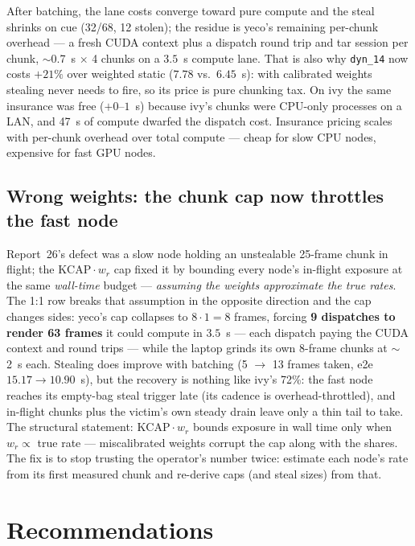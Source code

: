 \documentclass[
	english,
	letterpaper, oneside
]{article}
\begin{document}
After batching, the lane costs converge toward pure compute and the
steal shrinks on cue (32/68, 12 stolen); the residue is yeco's remaining
per-chunk overhead --- a fresh CUDA context plus a dispatch round trip
and tar session per chunk, $\sim$0.7~s $\times$ 4 chunks on a $3.5$~s
compute lane. That is also why \texttt{dyn\_14} now costs $+21\%$ over
weighted static ($7.78$ vs.\ $6.45$~s): with calibrated weights stealing
never needs to fire, so its price is pure chunking tax. On ivy the same
insurance was free ($+0$--$1$~s) because ivy's chunks were CPU-only
processes on a LAN, and 47~s of compute dwarfed the dispatch cost.
Insurance pricing scales with per-chunk overhead over total compute ---
cheap for slow CPU nodes, expensive for fast GPU nodes.

\subsection{Wrong weights: the chunk cap now throttles the fast node}
\label{sec:capdefect}

Report~26's defect was a slow node holding an unstealable 25-frame chunk
in flight; the $\mathrm{KCAP}\cdot w_r$ cap fixed it by bounding
every node's in-flight exposure at the same \emph{wall-time} budget ---
\emph{assuming the weights approximate the true rates}. The 1:1 row
breaks that assumption in the opposite direction and the cap changes
sides: yeco's cap collapses to $8\cdot1=8$ frames, forcing \textbf{9
dispatches to render 63 frames} it could compute in $3.5$~s --- each
dispatch paying the CUDA context and round trips --- while the laptop
grinds its own 8-frame chunks at $\sim$2~s each. Stealing does improve
with batching (5 $\to$ 13 frames taken, e2e $15.17 \to 10.90$~s), but
the recovery is nothing like ivy's 72\%: the fast node reaches its
empty-bag steal trigger late (its cadence is overhead-throttled), and
in-flight chunks plus the victim's own steady drain leave only a thin
tail to take. The structural statement: $\mathrm{KCAP}\cdot w_r$ bounds
exposure in wall time only when $w_r \propto$ true rate --- miscalibrated
weights corrupt the cap along with the shares. The fix is to stop
trusting the operator's number twice: estimate each node's rate from its
first measured chunk and re-derive caps (and steal sizes) from that.

\section{Recommendations}
\label{sec:recommendations}
\end{document}
